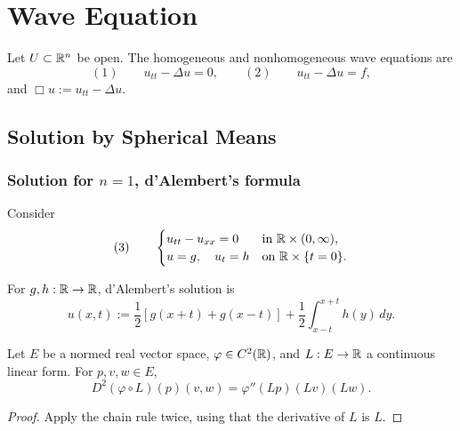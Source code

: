 \section{Wave Equation}
\label{sec:wave-equation}

Let $U\subset\mathbb{R}^n$ be open. The homogeneous and nonhomogeneous wave equations
are
$$(1)\qquad u_{tt}-\Delta u=0,
\qquad
(2)\qquad u_{tt}-\Delta u=f,$$
and $\Box u:=u_{tt}-\Delta u$.

\subsection{Solution by Spherical Means}
\label{sec:wave-solution-spherical-means}

\subsubsection{Solution for $n = 1$, d'Alembert's formula}
\label{sec:wave-dalembert-formula}

Consider
$$(3)\qquad
\begin{cases}
u_{tt}-u_{xx}=0&\text{in }\mathbb{R}\times(0,\infty),\\
u=g,\quad u_t=h&\text{on }\mathbb{R}\times\{t=0\}.
\end{cases}$$

\begin{definition}
\label{def:dalembert-formula}




For $g,h:\mathbb{R}\to\mathbb{R}$, d'Alembert's solution is
$$u(x,t):=\frac12[g(x+t)+g(x-t)]
+\frac12\int_{x-t}^{x+t}h(y)\,dy.$$
\end{definition}

\begin{lemma}
\label{lem:second-order-chain-rule-linear-form}




Let $E$ be a normed real vector space, $\varphi\in C^2(\mathbb{R})$, and
$L:E\to\mathbb{R}$ a continuous linear form. For $p,v,w\in E$,
$$D^2(\varphi\circ L)(p)(v,w)=\varphi''(Lp)(Lv)(Lw).$$
\end{lemma}
\begin{proof}

\sketch Apply the chain rule twice, using that the derivative of $L$ is $L$.
\end{proof}

